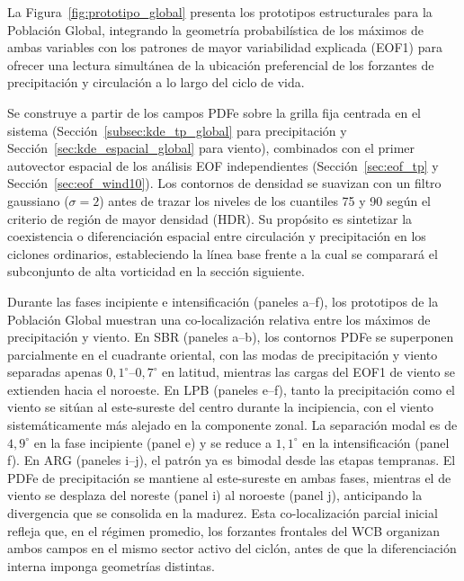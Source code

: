 La Figura~\ref{fig:prototipo_global} presenta los prototipos estructurales para la Población Global, integrando la geometría probabilística de los máximos de ambas variables con los patrones de mayor variabilidad explicada (EOF1) para ofrecer una lectura simultánea de la ubicación preferencial de los forzantes de precipitación y circulación a lo largo del ciclo de vida.

Se construye a partir de los campos PDFe sobre la grilla fija centrada en el sistema (Sección~\ref{subsec:kde_tp_global} para precipitación y Sección~\ref{sec:kde_espacial_global} para viento), combinados con el primer autovector espacial de los análisis EOF independientes (Sección~\ref{sec:eof_tp} y Sección~\ref{sec:eof_wind10}). Los contornos de densidad se suavizan con un filtro gaussiano ($\sigma = 2$) antes de trazar los niveles de los cuantiles 75 y 90 según el criterio de región de mayor densidad (HDR). Su propósito es sintetizar la coexistencia o diferenciación espacial entre circulación y precipitación en los ciclones ordinarios, estableciendo la línea base frente a la cual se comparará el subconjunto de alta vorticidad en la sección siguiente.

Durante las fases incipiente e intensificación (paneles a--f), los prototipos de la Población Global muestran una co-localización relativa entre los máximos de precipitación y viento. En SBR (paneles a--b), los contornos PDFe se superponen parcialmente en el cuadrante oriental, con las modas de precipitación y viento separadas apenas $0{,}1^{\circ}$--$0{,}7^{\circ}$ en latitud, mientras las cargas del EOF1 de viento se extienden hacia el noroeste. En LPB (paneles e--f), tanto la precipitación como el viento se sitúan al este-sureste del centro durante la incipiencia, con el viento sistemáticamente más alejado en la componente zonal. La separación modal es de $4{,}9^{\circ}$ en la fase incipiente (panel e) y se reduce a $1{,}1^{\circ}$ en la intensificación (panel f). En ARG (paneles i--j), el patrón ya es bimodal desde las etapas tempranas. El PDFe de precipitación se mantiene al este-sureste en ambas fases, mientras el de viento se desplaza del noreste (panel i) al noroeste (panel j), anticipando la divergencia que se consolida en la madurez. Esta co-localización parcial inicial refleja que, en el régimen promedio, los forzantes frontales del WCB organizan ambos campos en el mismo sector activo del ciclón, antes de que la diferenciación interna imponga geometrías distintas.

